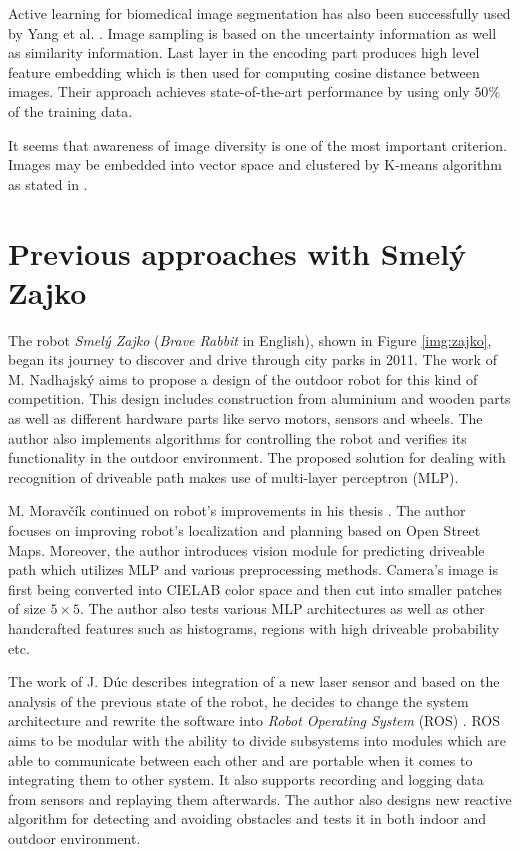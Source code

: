 Active learning for biomedical image segmentation has also been successfully used by
Yang et al. \cite{bib:yang2017suggestive}. Image sampling is based on the uncertainty information
as well as similarity information. Last layer in the encoding part produces high level feature
embedding which is then used for computing cosine distance between images. Their approach
achieves state-of-the-art performance by using only $50\%$ of the training data.

It seems that awareness of image diversity is one of the most important criterion. Images may
be embedded into vector space and clustered by K-means algorithm as stated in 
\cite{bib:zhdanov2019diverse}.

\section{Previous approaches with Smelý Zajko}
\label{sec:prev_approaches}

The robot \textit{Smelý Zajko} (\textit{Brave Rabbit} in English), shown in Figure \ref{img:zajko},
began its journey to discover and drive through city parks in 2011.
The work of M. Nadhajský \cite{bib:nadhajsky2011} aims to propose a design
of the outdoor robot for this kind of competition.
This design includes construction from aluminium and wooden parts
as well as different hardware parts like servo motors, sensors and wheels. The author
also implements algorithms for controlling the robot and verifies its functionality
in the outdoor environment. The proposed solution for dealing with recognition of
driveable path makes use of multi-layer perceptron (MLP).

M. Moravčík continued on robot's improvements in his thesis \cite{bib:moravcik2013}.
The author focuses on improving robot's localization and planning based on Open Street Maps.
Moreover, the author introduces vision module for predicting driveable path which utilizes
MLP and various preprocessing methods. Camera's image is first being
converted into CIELAB color space and then cut into smaller patches of size $5\times 5$.
The author also tests various MLP architectures as well as other handcrafted
features such as histograms, regions with high driveable probability etc.

The work of J. Dúc \cite{bib:duc2017} describes integration of a new laser sensor and
based on the analysis of the previous state of the robot, he decides to change the system
architecture
and rewrite the software into \textit{Robot Operating System} (ROS) \cite{bib:quigley2009ros}.
ROS aims to be modular with the ability to divide subsystems into modules which are able 
to communicate between each other and are portable when it comes to integrating them
to other system. It also supports recording and logging data from sensors and replaying 
them afterwards. The author also designs new reactive algorithm for detecting and avoiding
obstacles and tests it in both indoor and outdoor environment.

